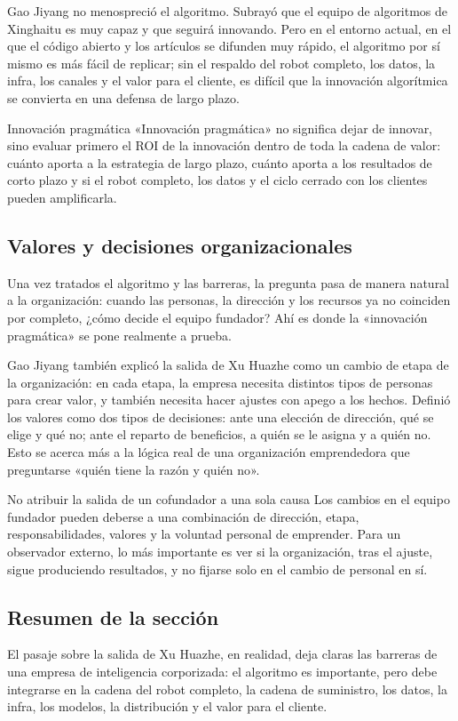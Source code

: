 Gao Jiyang no menospreció el algoritmo. Subrayó que el equipo de algoritmos de Xinghaitu es muy capaz y que seguirá innovando. Pero en el entorno actual, en el que el código abierto y los artículos se difunden muy rápido, el algoritmo por sí mismo es más fácil de replicar; sin el respaldo del robot completo, los datos, la infra, los canales y el valor para el cliente, es difícil que la innovación algorítmica se convierta en una defensa de largo plazo.

\begin{importantbox}{Innovación pragmática}
«Innovación pragmática» no significa dejar de innovar, sino evaluar primero el ROI de la innovación dentro de toda la cadena de valor: cuánto aporta a la estrategia de largo plazo, cuánto aporta a los resultados de corto plazo y si el robot completo, los datos y el ciclo cerrado con los clientes pueden amplificarla.
\end{importantbox}

\subsection{Valores y decisiones organizacionales}

Una vez tratados el algoritmo y las barreras, la pregunta pasa de manera natural a la organización: cuando las personas, la dirección y los recursos ya no coinciden por completo, ¿cómo decide el equipo fundador? Ahí es donde la «innovación pragmática» se pone realmente a prueba.

Gao Jiyang también explicó la salida de Xu Huazhe como un cambio de etapa de la organización: en cada etapa, la empresa necesita distintos tipos de personas para crear valor, y también necesita hacer ajustes con apego a los hechos. Definió los valores como dos tipos de decisiones: ante una elección de dirección, qué se elige y qué no; ante el reparto de beneficios, a quién se le asigna y a quién no. Esto se acerca más a la lógica real de una organización emprendedora que preguntarse «quién tiene la razón y quién no».

\begin{warningbox}{No atribuir la salida de un cofundador a una sola causa}
Los cambios en el equipo fundador pueden deberse a una combinación de dirección, etapa, responsabilidades, valores y la voluntad personal de emprender. Para un observador externo, lo más importante es ver si la organización, tras el ajuste, sigue produciendo resultados, y no fijarse solo en el cambio de personal en sí.
\end{warningbox}

\subsection{Resumen de la sección}

El pasaje sobre la salida de Xu Huazhe, en realidad, deja claras las barreras de una empresa de inteligencia corporizada: el algoritmo es importante, pero debe integrarse en la cadena del robot completo, la cadena de suministro, los datos, la infra, los modelos, la distribución y el valor para el cliente.

